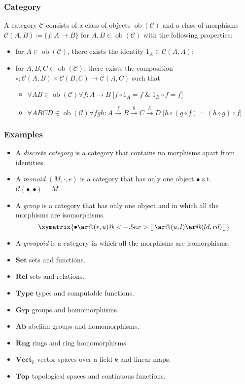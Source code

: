 \documentclass[UTF8,aspectratio=43,11pt,colorlinks,compress,openany]{beamer}%
\begin{document}
\begin{frame}\frametitle{Category}
\begin{definition}[Category]
A category $\mathcal{C}$ consists of a class of objects $\operatorname{ob}(\mathcal{C})$ and a class of morphisms $\mathcal{C}(A,B)\coloneqq \{f: A\to B\}$ for $A,B\in\operatorname{ob}(\mathcal{C})$ with the following properties:
\begin{itemize}
	\item for $A\in\operatorname{ob}(\mathcal{C})$, there exists the identity $1_A\in\mathcal{C}(A,A)$;
	\item for $A,B,C\in\operatorname{ob}(\mathcal{C})$, there exists the composition $\circ:\mathcal{C}(A,B)\times\mathcal{C}(B,C)\to\mathcal{C}(A,C)$ such that
		\begin{itemize}
			\item $\forall AB\in\operatorname{ob}(\mathcal{C})\forall f: A\to B\;\big[f\circ1_A=f\;\&\;1_B\circ f=f\big]$
			\item $\forall ABCD\in\operatorname{ob}(\mathcal{C})\forall fgh: A\xrightarrow{f}B\xrightarrow{g}C\xrightarrow{h}D\;\big[h\circ(g\circ f)=(h\circ g)\circ f\big]$
		\end{itemize}
\end{itemize}
\end{definition}
\end{frame}

\begin{frame}\frametitle{Examples}
\setlength\abovedisplayskip{0pt}
\setlength\belowdisplayskip{0pt}
\begin{itemize}
	\item A \emph{discrete category} is a category that contains no morphisms apart from identities.
	\item A \emph{monoid} $(M,\cdot,e)$ is a category that has only one object $\bullet$ s.t. $\mathcal{C}(\bullet,\bullet)=M$.
	\item A \emph{group} is a category that has only one object and in which all the morphisms are isomorphisms.\vspace*{-1ex}
\[
\xymatrix{\bullet \ar@(r,u)@<-.5ex>[]_{} \ar@(u,l) \ar@(ld,rd)[]_{}}
\]
	\item A \emph{groupoid} is a category in which all the morphisms are isomorphisms.
\end{itemize}
\begin{itemize}
	\item $\mathbf{Set}$ sets and functions.
	\item $\mathbf{Rel}$ sets and relations.
	\item $\mathbf{Type}$ types and computable functions.
	\item $\mathbf{Grp}$ groups and homomorphisms.
	\item $\mathbf{Ab}$ abelian groups and homomorphisms.
	\item $\mathbf{Rng}$ rings and ring homomorphisms.
	\item $\mathbf{Vect}_k$ vector spaces over a field $k$ and linear maps.
	\item $\mathbf{Top}$ topological spaces and continuous functions.
\end{itemize}
\end{frame}
\end{document}

